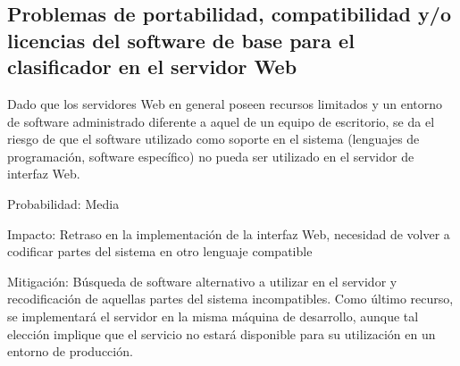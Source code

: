 \documentclass[bibliography=openstyle,DIV=12]{scrartcl}
\begin{document}
\subsection{Problemas de portabilidad, compatibilidad y/o licencias del software de base para el clasificador en el servidor Web}
Dado que los servidores Web en general poseen recursos limitados y un entorno de software administrado diferente a aquel de un equipo de escritorio, se da el riesgo de que el software utilizado como soporte en el sistema (lenguajes de programación, software específico) no pueda ser utilizado en el servidor de interfaz Web.
\begin{description*}
  \item[Probabilidad:] Media
  \item[Impacto:] Retraso en la implementación de la interfaz Web, necesidad de volver a codificar partes del sistema en otro lenguaje compatible
  \item[Mitigación:] Búsqueda de software alternativo a utilizar en el servidor y recodificación de aquellas partes del sistema incompatibles. Como último recurso, se implementará el servidor en la misma máquina de desarrollo, aunque tal elección implique que el servicio no estará disponible para su utilización en un entorno de producción.
\end{description*}
%
%
\end{document}
